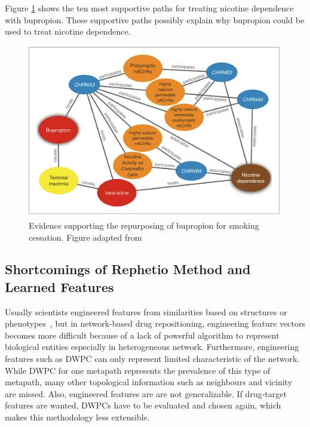 Figure \ref{fig:most_supportive_hetio} shows the ten most supportive paths for treating nicotine dependence with bupropion. These supportive paths possibly explain why bupropion could be used to treat nicotine dependence.

\begin{figure}[!h]
    \centering
    \includegraphics[scale=0.5]
    {figures/10_most_supportive.png}
    \captionsetup{justification=centering}
    \caption[Evidence supporting the repurposing of bupropion for smoking cessation]{\label{fig:most_supportive_hetio} Evidence supporting the repurposing of bupropion for smoking cessation. Figure adapted from \cite{himmelstein_systematic_2017}}
\end{figure}

\subsection{Shortcomings of Rephetio Method and Learned Features}

Usually scientists engineered features from similarities based on structures or phenotypes~\cite{perlman_combining_2011}, but in network-based drug repositioning, engineering feature vectors becomes more difficult because of a lack of powerful algorithm to represent biological entities especially in heterogeneous network. Furthermore, engineering features such as \ac{DWPC} can only represent limited characteristic of the network. While \ac{DWPC} for one metapath represents the prevalence of this type of metapath, many other topological information such as neighbours and vicinity are missed. Also, engineered features are are not generalizable. If drug-target features are wanted, \ac{DWPC}s have to be evaluated and chosen again, which makes this methodology less extensible.


